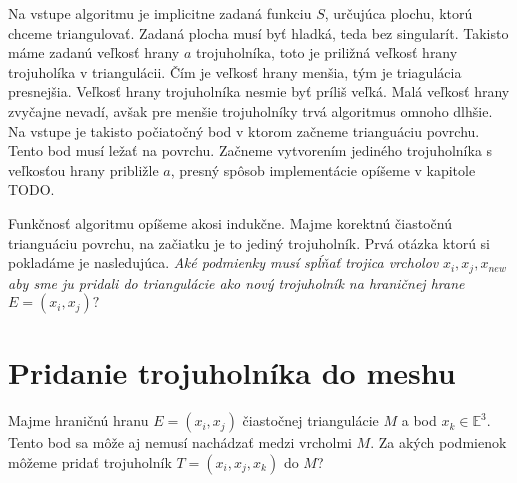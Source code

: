 Na vstupe algoritmu je implicitne zadaná funkciu $S$, určujúca plochu, ktorú chceme triangulovať. 
Zadaná plocha musí byť hladká, teda bez singularít.
Takisto máme zadanú veľkosť hrany $a$ trojuholníka, toto je priližná veľkosť hrany trojuholíka v 
triangulácii. Čím je veľkosť hrany menšia, tým je triagulácia presnejšia. Veľkosť hrany trojuholníka 
nesmie byť príliš veľká. Malá veľkosť hrany zvyčajne nevadí, avšak pre menšie trojuholníky trvá 
algoritmus omnoho dlhšie. Na vstupe je takisto počiatočný bod v ktorom začneme trianguáciu povrchu.
Tento bod musí ležať na povrchu.
Začneme vytvorením jediného trojuholníka s veľkosťou hrany približle $a$, presný spôsob implementácie
opíšeme v kapitole TODO.

Funkčnosť algoritmu opíšeme akosi indukčne. Majme korektnú čiastočnú trianguáciu povrchu, na začiatku
je to jediný trojuholník. Prvá otázka ktorú si pokladáme je nasledujúca. 
\textit{Aké podmienky musí spĺňať trojica vrcholov} $x_i, x_j, x_{new}$ 
\textit{aby sme ju pridali do triangulácie ako nový trojuholník na hraničnej hrane} $E = (x_i, x_j)?$ 

\section{Pridanie trojuholníka do meshu}
\label{kap:triangle_conditions}

Majme hraničnú hranu $E=(x_i, x_j)$ čiastočnej triangulácie $M$ a bod $x_k \in \mathbb{E}^3$. 
Tento bod sa môže aj nemusí nachádzať medzi vrcholmi $M$. Za akých podmienok môžeme pridať trojuholník 
$T=(x_i, x_j, x_k)$ do $M$?

